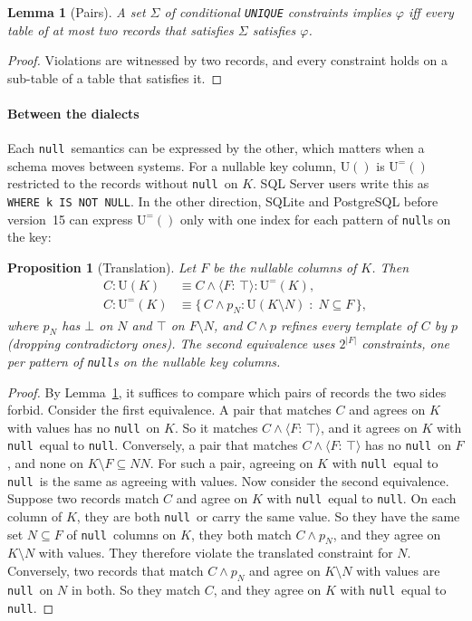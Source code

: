 \documentclass[conference]{IEEEtran}
\newtheorem{lemma}[theorem]{Lemma}
\newtheorem{proposition}[theorem]{Proposition}
\theoremstyle{definition}
\newcommand{\sql}[1]{\texttt{#1}}
\newcommand{\nul}{\texttt{null}}
\newcommand{\NN}{\mathit{NN}}
\newcommand{\Sig}{\Sigma}
\newcommand{\U}[1]{\mathrm{U}(#1)}
\newcommand{\Ueq}[1]{\mathrm{U}^{=}(#1)}
\newcommand{\tpl}[1]{\ensuremath{\langle #1\rangle}}
\newif\ifextended
\begin{document}
\begin{lemma}[Pairs]\label{lem:pairs}
A set $\Sig$ of conditional \sql{UNIQUE} constraints implies $\varphi$ iff every table of at most
two records that satisfies $\Sig$ satisfies $\varphi$.
\end{lemma}

\begin{proof}
Violations are witnessed by two records, and every constraint holds on a sub-table of a table
that satisfies it.
\end{proof}

\paragraph*{Between the dialects} Each \nul\ semantics can be expressed by the other, which matters when a schema
moves between systems. For a nullable key column, $\U{}$ is $\Ueq{}$ restricted to the records without \nul\ on $K$. SQL
Server users write this as \sql{WHERE k IS NOT NULL}. In the other direction, SQLite and PostgreSQL before version~15
can express $\Ueq{}$ only with one index for each pattern of \nul s on the key:

\begin{proposition}[Translation]\label{prop:translate}
Let $F$ be the nullable columns of $K$. Then
\begin{align*}
C:\U{K}&\equiv C\wedge\tpl{F{:}\,\top}:\Ueq{K},\\
C:\Ueq{K}&\equiv\{\,C\wedge p_N:\U{K\setminus N}\;:\;N\subseteq F\,\},
\end{align*}
where $p_N$ has $\bot$ on $N$ and $\top$ on $F\setminus N$, and $C\wedge p$ refines every template
of $C$ by $p$ (dropping contradictory ones). The second equivalence uses $2^{|F|}$ constraints,
one per pattern of \nul s on the nullable key columns.
\end{proposition}

\ifextended
\begin{proof}
By Lemma~\ref{lem:pairs}, it suffices to compare which pairs of records the two sides forbid. Consider the first
equivalence. A pair that matches $C$ and agrees on $K$ with values has no \nul\ on $K$. So it matches
$C\wedge\tpl{F{:}\,\top}$, and it agrees on $K$ with \nul\ equal to \nul. Conversely, a pair that matches
$C\wedge\tpl{F{:}\,\top}$ has no \nul\ on $F$, and none on $K\setminus F\subseteq\NN$. For such a pair, agreeing on $K$
with \nul\ equal to \nul\ is the same as agreeing with values. Now consider the second equivalence. Suppose two records
match $C$ and agree on $K$ with \nul\ equal to \nul. On each column of $K$, they are both \nul\ or carry the same value.
So they have the same set $N\subseteq F$ of \nul\ columns on $K$, they both match $C\wedge p_N$, and they agree on
$K\setminus N$ with values. They therefore violate the translated constraint for $N$. Conversely, two records that match
$C\wedge p_N$ and agree on $K\setminus N$ with values are \nul\ on $N$ in both. So they match $C$, and they agree on $K$
with \nul\ equal to \nul.
\end{proof}
\end{document}
